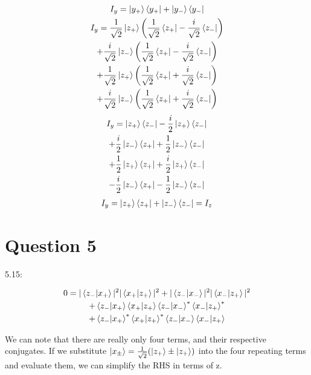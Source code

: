 \documentclass{article}
\begin{document}
    \begin{gather*}
        I_y = \ket{y_+}\bra{y_+} + \ket{y_-}\bra{y_-}\\
        I_y = \frac{1}{\sqrt{2}}\ket{z_+}\left(\frac{1}{\sqrt{2}}\bra{z_+}-\frac{i}{\sqrt{2}}\bra{z_-}\right)\\
        +     \frac{i}{\sqrt{2}}\ket{z_-}\left(\frac{1}{\sqrt{2}}\bra{z_+}-\frac{i}{\sqrt{2}}\bra{z_-}\right)\\
        +     \frac{1}{\sqrt{2}}\ket{z_+}\left(\frac{1}{\sqrt{2}}\bra{z_+}+\frac{i}{\sqrt{2}}\bra{z_-}\right)\\
        +     \frac{i}{\sqrt{2}}\ket{z_-}\left(\frac{1}{\sqrt{2}}\bra{z_+}+\frac{i}{\sqrt{2}}\bra{z_-}\right)\\
    \end{gather*}
    \begin{gather*}
       I_y = \ket{z_+}\bra{z_-} - \frac{i}{2}\ket{z_+}\bra{z_-}\\
        + \frac{i}{2}\ket{z_-}\bra{z_+} + \frac{1}{2}\ket{z_-}\bra{z_-}\\
        + \frac{1}{2}\ket{z_+}\bra{z_+} + \frac{i}{2}\ket{z_+}\bra{z_-}\\
        - \frac{i}{2}\ket{z_-}\bra{z_+} - \frac{1}{2}\ket{z_-}\bra{z_-}\\
    \end{gather*}
    \begin{gather}
        I_y = \ket{z_+}\bra{z_+} + \ket{z_-}\bra{z_-} = I_z
    \end{gather}


\section{Question 5}

    5.15:

    \begin{gather*}
        0 = |\braket{z_-|x_+}|^2|\braket{x_+|z_+}|^2 + |\braket{z_-|x_-}|^2|\braket{x_-|z_+}|^2\\
          + \braket{z_-|x_+}\braket{x_+|z_+}\braket{z_-|x_-}^*\braket{x_-|z_+}^*\\
          + \braket{z_-|x_+}^*\braket{x_+|z_+}^*\braket{z_-|x_-}\braket{x_-|z_+}
    \end{gather*}

    We can note that there are really only four terms, and their respective conjugates.
    If we substitute $\ket{x_\pm} = \frac{1}{\sqrt{2}}(\ket{z_+} \pm \ket{z_+})$ into the four repeating terms and evaluate them,
    we can simplify the RHS in terms of z.
\end{document}
